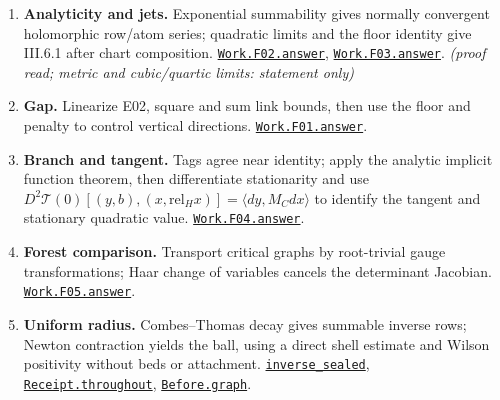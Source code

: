 \documentclass[
  letterpaper,
  11pt]{article}
\providecommand{\tightlist}{%
  \setlength{\itemsep}{0pt}\setlength{\parskip}{0pt}}
\begin{document}
\begin{enumerate}
\def\labelenumi{\arabic{enumi}.}
\tightlist
\item
  \textbf{Analyticity and jets.} Exponential summability gives normally
  convergent holomorphic row/atom series; quadratic limits and the floor
  identity give III.6.1 after chart composition.
  \href{https://github.com/yang-mills-group/OpenAI-YM-20261028/blob/3456e5e75cf8d4cd558955a5c7638fba2d68f464/YM/Work/F02.lean\#L141-L143}{\texttt{Work.F02.answer}},
  \href{https://github.com/yang-mills-group/OpenAI-YM-20261028/blob/3456e5e75cf8d4cd558955a5c7638fba2d68f464/YM/Work/F03.lean\#L159-L175}{\texttt{Work.F03.answer}}.
  \emph{(proof read; metric and cubic/quartic limits: statement only)}
\item
  \textbf{Gap.} Linearize E02, square and sum link bounds, then use the
  floor and penalty to control vertical directions.
  \href{https://github.com/yang-mills-group/OpenAI-YM-20261028/blob/3456e5e75cf8d4cd558955a5c7638fba2d68f464/YM/Work/F01.lean\#L266-L311}{\texttt{Work.F01.answer}}.
\item
  \textbf{Branch and tangent.} Tags agree near identity; apply the
  analytic implicit function theorem, then differentiate stationarity
  and use
  \(D^2\mathcal T(0)[(y,b),(x,\mathrm{rel}_Hx)]=\langle dy,M_Cdx\rangle\)
  to identify the tangent and stationary quadratic value.
  \href{https://github.com/yang-mills-group/OpenAI-YM-20261028/blob/3456e5e75cf8d4cd558955a5c7638fba2d68f464/YM/Work/F04.lean\#L149-L159}{\texttt{Work.F04.answer}}.
\item
  \textbf{Forest comparison.} Transport critical graphs by root-trivial
  gauge transformations; Haar change of variables cancels the
  determinant Jacobian.
  \href{https://github.com/yang-mills-group/OpenAI-YM-20261028/blob/3456e5e75cf8d4cd558955a5c7638fba2d68f464/YM/Work/F05.lean\#L60-L67}{\texttt{Work.F05.answer}}.
\item
  \textbf{Uniform radius.} Combes--Thomas decay gives summable inverse
  rows; Newton contraction yields the ball, using a direct shell
  estimate and Wilson positivity without beds or attachment.
  \href{https://github.com/yang-mills-group/OpenAI-YM-20261028/blob/3456e5e75cf8d4cd558955a5c7638fba2d68f464/YM/Push/STATIONARY_UNIFORM/Resolvent.lean\#L171-L208}{\texttt{inverse\_sealed}},
  \href{https://github.com/yang-mills-group/OpenAI-YM-20261028/blob/3456e5e75cf8d4cd558955a5c7638fba2d68f464/YM/Push/STATIONARY_UNIFORM/ImplicitRadius.lean\#L179-L215}{\texttt{Receipt.throughout}},
  \href{https://github.com/yang-mills-group/OpenAI-YM-20261028/blob/3456e5e75cf8d4cd558955a5c7638fba2d68f464/YM/Push/STATIONARY_UNIFORM/Paths.lean\#L253-L294}{\texttt{Before.graph}}.

\end{enumerate}
\end{document}
